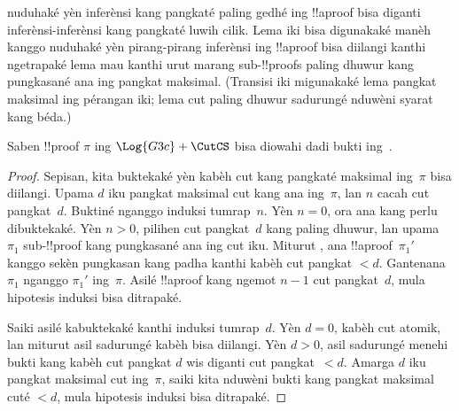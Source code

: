\documentclass[../../../include/open-logic-section]{subfiles}
\begin{document}


 nuduhaké yèn inferènsi \CutCS{}
kang pangkaté paling gedhé ing !!a{proof} bisa diganti
inferènsi-inferènsi \CutCS{} kang pangkaté luwih cilik.
Lema iki bisa digunakaké manèh kanggo nuduhaké yèn
pirang-pirang inferènsi \CutCS{} ing !!a{proof} bisa
diilangi kanthi ngetrapaké lema mau kanthi urut marang
sub-!!{proof}s paling dhuwur kang pungkasané ana ing
\CutCS{} pangkat maksimal.
(Transisi iki migunakaké lema pangkat maksimal ing pérangan iki; lema cut paling dhuwur sadurungé nduwèni syarat kang béda.)

\begin{thm}
Saben !!{proof} $\pi$ ing $\Log{G3c} + \CutCS$
bisa diowahi dadi bukti ing~.
\end{thm}

\begin{proof}
  Sepisan, kita buktekaké yèn kabèh cut kang pangkaté maksimal
  ing~$\pi$ bisa diilangi. Upama $d$ iku pangkat maksimal cut
  kang ana ing~$\pi$, lan $n$ cacah cut pangkat~$d$.
  Buktiné nganggo induksi tumrap~$n$. Yèn $n=0$, ora ana
  kang perlu dibuktekaké. Yèn $n>0$, pilihen cut pangkat~$d$
  kang paling dhuwur, lan upama $\pi_1$ sub-!!{proof} kang
  pungkasané ana ing cut iku. Miturut
  , ana !!a{proof}~$\pi_1'$
  kanggo sekèn pungkasan kang padha kanthi kabèh cut
  pangkat $<d$. Gantenana $\pi_1$ nganggo $\pi_1'$ ing~$\pi$.
  Asilé !!a{proof} kang ngemot $n-1$ cut pangkat~$d$,
  mula hipotesis induksi bisa ditrapaké.

  Saiki asilé kabuktekaké kanthi induksi tumrap~$d$. Yèn $d=0$,
  kabèh cut atomik, lan miturut asil sadurungé kabèh bisa
  diilangi. Yèn $d>0$, asil sadurungé menehi bukti kang
  kabèh cut pangkat $d$ wis diganti cut pangkat~$<d$.
  Amarga $d$ iku pangkat maksimal cut ing~$\pi$, saiki
  kita nduwèni bukti kang pangkat maksimal cuté $<d$,
  mula hipotesis induksi bisa ditrapaké.
\end{proof}
\end{document}
